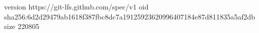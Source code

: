 version https://git-lfs.github.com/spec/v1
oid sha256:6d2d29479ab1618f387fbc8dc7a19125923620996407184e87d811835a5af2db
size 220805
